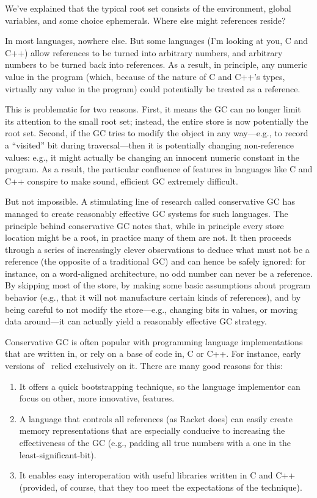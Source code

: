
We’ve explained that the typical root set consists of the environment, global
variables, and some choice ephemerals. Where else might references reside?

In most languages, nowhere else. But some languages (I’m looking at you, C and
C++) allow references to be turned into arbitrary numbers, and arbitrary numbers
to be turned back into references. As a result, in principle, any numeric value
in the program (which, because of the nature of C and C++’s types, virtually any
value in the program) could potentially be treated as a reference.

This is problematic for two reasons. First, it means the GC can no longer limit
its attention to the small root set; instead, the entire store is now
potentially the root set. Second, if the GC tries to modify the object in any
way—e.g., to record a “visited” bit during traversal—then it is potentially
changing non-reference values: e.g., it might actually be changing an innocent
numeric constant in the program. As a result, the particular confluence of
features in languages like C and C++ conspire to make sound, efficient GC
extremely difficult.

But not impossible. A stimulating line of research called conservative GC has
managed to create reasonably effective GC systems for such languages. The
principle behind conservative GC notes that, while in principle every store
location might be a root, in practice many of them are not. It then proceeds
through a series of increasingly clever observations to deduce what must not be
a reference (the opposite of a traditional GC) and can hence be safely ignored:
for instance, on a word-aligned architecture, no odd number can never be a
reference. By skipping most of the store, by making some basic assumptions about
program behavior (e.g., that it will not manufacture certain kinds of
references), and by being careful to not modify the store—e.g., changing bits in
values, or moving data around—it can actually yield a reasonably effective GC
strategy.

Conservative GC is often popular with programming language implementations that
are written in, or rely on a base of code in, C or C++. For instance, early
versions of \racket\ relied exclusively on it. There are many good reasons for
this:
\begin{enumerate}
  \item 
It offers a quick bootstrapping technique, so the language implementor can focus
on other, more innovative, features.
  \item 
A language that controls all references (as Racket does) can easily create
memory representations that are especially conducive to increasing the
effectiveness of the GC (e.g., padding all true numbers with a one in the
least-significant-bit).
  \item 
It enables easy interoperation with useful libraries written in C and C++
(provided, of course, that they too meet the expectations of the technique).
\end{enumerate}

